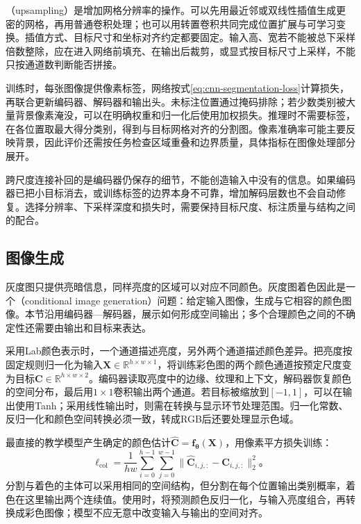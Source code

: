 （upsampling）是增加网格分辨率的操作。可以先用最近邻或双线性插值生成更密的网格，再用普通卷积处理；也可以用转置卷积共同完成位置扩展与可学习变换。插值方式、目标尺寸和坐标对齐约定都要固定。输入高、宽若不能被总下采样倍数整除，应在进入网络前填充、在输出后裁剪，或显式按目标尺寸上采样，不能只按通道数判断能否拼接。

训练时，每张图像提供像素标签，网络按式\eqref{eq:cnn-segmentation-loss}计算损失，再联合更新编码器、解码器和输出头。未标注位置通过掩码排除；若少数类别被大量背景像素淹没，可以在明确权重和归一化后使用加权损失。推理时不需要标签，在各位置取最大得分类别，得到与目标网格对齐的分割图。像素准确率可能主要反映背景，因此评价还需按任务检查区域重叠和边界质量，具体指标在图像处理部分展开。

跨尺度连接补回的是编码器仍保存的细节，不能创造输入中没有的信息。如果编码器已把小目标消去，或训练标签的边界本身不可靠，增加解码层数也不会自动修复。选择分辨率、下采样深度和损失时，需要保持目标尺度、标注质量与结构之间的配合。

\FloatBarrier

\subsection{图像生成}
\label{sec:cnn-colorization}

灰度图只提供亮暗信息，同样亮度的区域可以对应不同颜色。灰度图着色因此是一个（conditional image generation）问题：给定输入图像，生成与它相容的颜色图像。本节沿用编码器—解码器，展示如何形成空间输出；多个合理颜色之间的不确定性还需要由输出和目标来表达。

采用Lab颜色表示时，一个通道描述亮度，另外两个通道描述颜色差异。把亮度按固定规则归一化为输入$\bm X\in\mathbb R^{h\times w\times1}$，将训练彩色图的两个颜色通道按预定尺度变为目标$\bm C\in\mathbb R^{h\times w\times2}$。编码器读取亮度中的边缘、纹理和上下文，解码器恢复颜色的空间分布，最后用$1\times1$卷积输出两个通道。若目标被缩放到$[-1,1]$，可以在输出使用Tanh；采用线性输出时，则需在转换与显示环节处理范围。归一化常数、反归一化和颜色空间转换必须一致，转成RGB后还要处理显示色域。

最直接的教学模型产生确定的颜色估计$\widehat{\bm C}=\bm f_{\bm\theta}(\bm X)$，用像素平方损失训练：
\begin{equation}
  \ell_{\mathrm{col}}=\frac1{hw}\sum_{i=0}^{h-1}\sum_{j=0}^{w-1}
      \lVert\widehat{\bm C}_{i,j,:}-\bm C_{i,j,:}\rVert_2^2\text{。}
  \label{eq:cnn-colorization-loss}
\end{equation}
分割与着色的主体可以采用相同的空间结构，但分割在每个位置输出类别概率，着色在这里输出两个连续值。使用时，将预测颜色反归一化，与输入亮度组合，再转换成彩色图像；模型不应无意中改变输入与输出的空间对齐。

